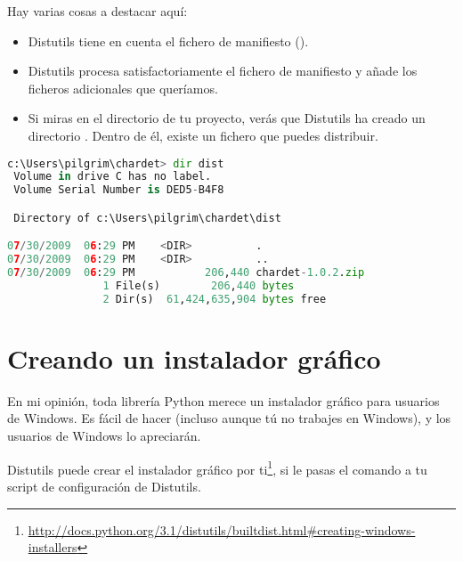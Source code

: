 {Hay varias cosas a destacar aquí:

\begin{itemize}
  \item Distutils tiene en cuenta el fichero de manifiesto ().
  \item Distutils procesa satisfactoriamente el fichero de manifiesto y añade los ficheros adicionales que queríamos.
  \item Si miras en el directorio de tu proyecto, verás que Distutils ha creado un directorio . Dentro de él, existe un fichero  que puedes distribuir.
\end{itemize}

\begin{lstlisting}[language=Python,breaklines=true]
c:\Users\pilgrim\chardet> dir dist
 Volume in drive C has no label.
 Volume Serial Number is DED5-B4F8

 Directory of c:\Users\pilgrim\chardet\dist

07/30/2009  06:29 PM    <DIR>          .
07/30/2009  06:29 PM    <DIR>          ..
07/30/2009  06:29 PM           206,440 chardet-1.0.2.zip
               1 File(s)        206,440 bytes
               2 Dir(s)  61,424,635,904 bytes free
\end{lstlisting}

\section{Creando un instalador gráfico}

En mi opinión, toda librería Python merece un instalador gráfico para usuarios de Windows. Es fácil de hacer (incluso aunque tú no trabajes en Windows), y los usuarios de Windows lo apreciarán.

Distutils puede crear el instalador gráfico por ti\footnote{\href{http://docs.python.org/3.1/distutils/builtdist.html\#creating-windows-installers}{http://docs.python.org/3.1/distutils/builtdist.html\#creating-windows-installers}}, si le pasas el comando  a tu script de configuración de Distutils.


}
